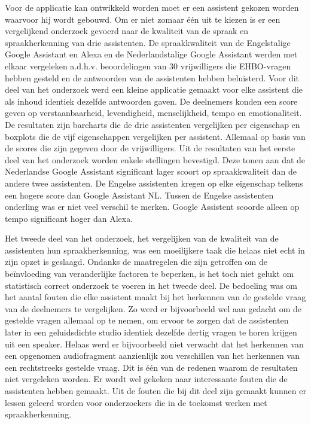 Voor de applicatie kan ontwikkeld worden moet er een assistent gekozen worden waarvoor hij wordt gebouwd. Om er niet zomaar één uit te kiezen is er een vergelijkend onderzoek gevoerd naar de kwaliteit van de spraak en spraakherkenning van drie assistenten.
De spraakkwaliteit van de Engelstalige Google Assistant en Alexa en de Nederlandstalige Google Assistant werden met elkaar vergeleken a.d.h.v. beoordelingen van 30 vrijwilligers die EHBO-vragen hebben gesteld en de antwoorden van de assistenten hebben beluisterd. Voor dit deel van het onderzoek werd een kleine applicatie gemaakt voor elke assistent die als inhoud identiek dezelfde antwoorden gaven. De deelnemers konden een score geven op verstaanbaarheid, levendigheid, menselijkheid, tempo en emotionaliteit. De resultaten zijn barcharts die de drie assistenten vergelijken per eigenschap en boxplots die de vijf eigenschappen vergelijken per assistent. Allemaal op basis van de scores die zijn gegeven door de vrijwilligers.
Uit de resultaten van het eerste deel van het onderzoek worden enkele stellingen bevestigd. Deze tonen aan dat de Nederlandse Google Assistant significant lager scoort op spraakkwaliteit dan de andere twee assistenten. De Engelse assistenten kregen op elke eigenschap telkens een hogere score dan Google Assistant NL. Tussen de Engelse assistenten onderling was er niet veel verschil te merken. Google Assistent scoorde alleen op tempo significant hoger dan Alexa.

Het tweede deel van het onderzoek, het vergelijken van de kwaliteit van de assistenten hun spraakherkenning, was een moeilijkere taak die helaas niet echt in zijn opzet is geslaagd. Ondanks de maatregelen die zijn getroffen om de beïnvloeding van veranderlijke factoren te beperken, is het toch niet gelukt om statistisch correct onderzoek te voeren in het tweede deel. De bedoeling was om het aantal fouten die elke assistent maakt bij het herkennen van de gestelde vraag van de deelnemers te vergelijken. Zo werd er bijvoorbeeld wel aan gedacht om de gestelde vragen allemaal op te nemen, om ervoor te zorgen dat de assistenten later in een geluidsdichte studio identiek dezelfde dertig vragen te horen krijgen uit een speaker. Helaas werd er bijvoorbeeld niet verwacht dat het herkennen van een opgenomen audiofragment aanzienlijk zou verschillen van het herkennen van een rechtstreeks gestelde vraag. Dit is één van de redenen waarom de resultaten niet vergeleken worden. Er wordt wel gekeken naar interessante fouten die de assistenten hebben gemaakt. Uit de fouten die bij dit deel zijn gemaakt kunnen er lessen geleerd worden voor onderzoekers die in de toekomst werken met spraakherkenning.

